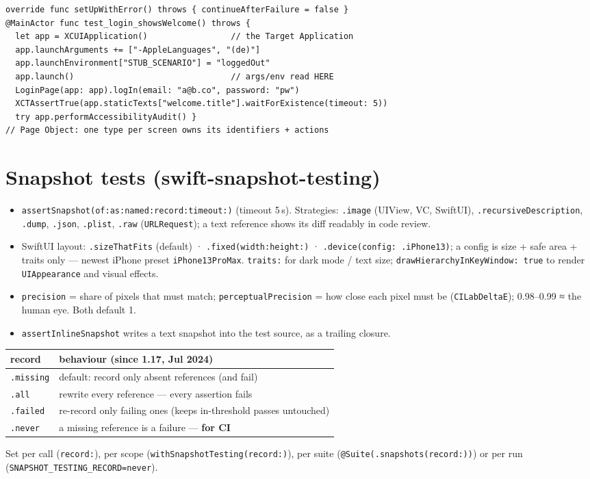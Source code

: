 \documentclass[8pt]{extarticle}
\newcommand\ct[1]{\texttt{#1}}
\begin{document}
\begin{multicols}{2}
\begin{lstlisting}[language=SwiftSheet]
override func setUpWithError() throws { continueAfterFailure = false }
@MainActor func test_login_showsWelcome() throws {
  let app = XCUIApplication()                 // the Target Application
  app.launchArguments += ["-AppleLanguages", "(de)"]
  app.launchEnvironment["STUB_SCENARIO"] = "loggedOut"
  app.launch()                                // args/env read HERE
  LoginPage(app: app).logIn(email: "a@b.co", password: "pw")
  XCTAssertTrue(app.staticTexts["welcome.title"].waitForExistence(timeout: 5))
  try app.performAccessibilityAudit() }
// Page Object: one type per screen owns its identifiers + actions
\end{lstlisting}

\section{Snapshot tests (swift-snapshot-testing)}
\begin{itemize}\raggedright
  \item \ct{assertSnapshot(of:as:named:record:timeout:)} (timeout 5\,s). Strategies: \ct{.image}
        (UIView, VC, SwiftUI), \ct{.recursiveDescription}, \ct{.dump}, \ct{.json}, \ct{.plist},
        \ct{.raw} (\ct{URLRequest}); a text reference shows its diff readably in code review.
  \item SwiftUI layout: \ct{.sizeThatFits} (default) · \ct{.fixed(width:height:)} ·
        \ct{.device(config: .iPhone13)}; a config is size + safe area + traits only — newest iPhone
        preset \ct{iPhone13ProMax}. \ct{traits:} for dark mode / text size;
        \ct{drawHierarchyInKeyWindow: true} to render \ct{UIAppearance} and visual effects.
  \item \ct{precision} = share of pixels that must match; \ct{perceptualPrecision} = how close each
        pixel must be (\ct{CILabDeltaE}); 0.98–0.99 ≈ the human eye. Both default 1.
  \item \ct{assertInlineSnapshot} writes a text snapshot into the test source, as a trailing closure.
\end{itemize}
{\scriptsize\setlength{\tabcolsep}{2pt}
\begin{tabular}{@{}>{\raggedright\arraybackslash}p{10mm}>{\raggedright\arraybackslash}p{63mm}@{}}
\toprule
\textbf{record} & \textbf{behaviour} (since 1.17, Jul 2024)\\
\midrule
\ct{.missing} & default: record only absent references (and fail)\\
\ct{.all} & rewrite every reference — every assertion fails\\
\ct{.failed} & re-record only failing ones (keeps in-threshold passes untouched)\\
\ct{.never} & a missing reference is a failure — \textbf{for CI}\\
\bottomrule
\end{tabular}}\par
Set per call (\ct{record:}), per scope (\ct{withSnapshotTesting(record:)}), per suite
(\ct{@Suite(.snapshots(record:))}) or per run (\ct{SNAPSHOT\_TESTING\_RECORD=never}).


\end{multicols}
\end{document}
